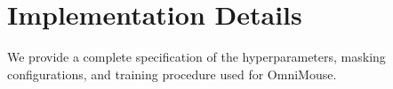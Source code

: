 \documentclass{article} %
\begin{document}
\newpage


\newpage
\appendix
\setcounter{figure}{0}
\renewcommand{\thefigure}{S\arabic{figure}}
\setcounter{table}{0}
\renewcommand{\thetable}{S\arabic{table}}

\section{Implementation Details}
\label{sec:results-appendix}

We provide a complete specification of the hyperparameters, masking configurations, and training procedure used for OmniMouse.
\end{document}
